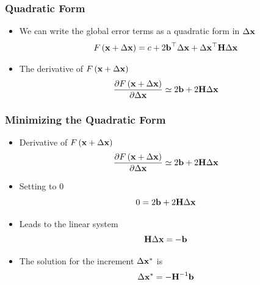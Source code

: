 \begin{frame}
    \frametitle{Quadratic Form}
    
    \begin{itemize}
        \item We can write the global error terms as a quadratic form in $\Delta \boldsymbol{\mathbf{x}}$
        \begin{equation*}
            F\left(\boldsymbol{\mathbf{x}} + \Delta \boldsymbol{\mathbf{x}} \right) = c + 2 \boldsymbol{\mathbf{b}}^{\top} \Delta \boldsymbol{\mathbf{x}} + \Delta \boldsymbol{\mathbf{x}}^{\top} \boldsymbol{\mathbf{H}} \Delta \boldsymbol{\mathbf{x}}
        \end{equation*}
        \item The derivative of $F\left(\boldsymbol{\mathbf{x}} + \Delta \boldsymbol{\mathbf{x}} \right)$
        \begin{equation*}
            \dfrac{\partial F\left(\boldsymbol{\mathbf{x}} + \Delta \boldsymbol{\mathbf{x}} \right)}{\partial \Delta \boldsymbol{\mathbf{x}}} \simeq 2 \boldsymbol{\mathbf{b}} + 2 \boldsymbol{\mathbf{H}} \Delta \boldsymbol{\mathbf{x}}
        \end{equation*}
    \end{itemize}
    
\end{frame}

\begin{frame}
    \frametitle{Minimizing the Quadratic Form}
    
    \begin{itemize}
        \item Derivative of $F\left(\boldsymbol{\mathbf{x}} + \Delta \boldsymbol{\mathbf{x}} \right)$
        \begin{equation*}
            \dfrac{\partial F\left(\boldsymbol{\mathbf{x}} + \Delta \boldsymbol{\mathbf{x}} \right)}{\partial \Delta \boldsymbol{\mathbf{x}}} \simeq 2 \boldsymbol{\mathbf{b}} + 2 \boldsymbol{\mathbf{H}} \Delta \boldsymbol{\mathbf{x}}
        \end{equation*}
        \item Setting to 0
        \begin{equation*}
            0 = 2 \boldsymbol{\mathbf{b}} + 2 \boldsymbol{\mathbf{H}} \Delta \boldsymbol{\mathbf{x}}
        \end{equation*}
        \item Leads to the linear system
        \begin{equation*}
            \boldsymbol{\mathbf{H}} \Delta \boldsymbol{\mathbf{x}} = -\boldsymbol{\mathbf{b}} 
        \end{equation*}
        \item The solution for the increment $\Delta \boldsymbol{\mathbf{x}}^{*}$ is
        \begin{equation*}
             \Delta \boldsymbol{\mathbf{x}}^{*} = - {\boldsymbol{\mathbf{H}}}^{-1} \boldsymbol{\mathbf{b}} 
        \end{equation*}
    \end{itemize}
    
\end{frame}

